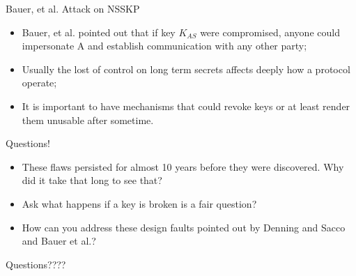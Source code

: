 \documentclass[12pt,table,xcolor={dvipsnames}]{beamer}
\begin{document}
\begin{frame}{Bauer, et al. Attack on NSSKP}
\begin{itemize}
\item Bauer, et al. pointed out that if key $K_{AS}$ were compromised, anyone could impersonate A and establish communication with any other party;\pause
\item Usually the lost of control on long term secrets affects deeply how a protocol operate;\pause
\item It is important to have mechanisms that could revoke keys or at least render them unusable after sometime.
\end{itemize}
\end{frame}

\begin{frame}{Questions!}
\begin{itemize}
\item These flaws persisted for almost 10 years before they were discovered. Why did it take that long to see that?\pause
\item Ask what happens if a key is broken is a fair question?\pause
\item How can you address these design faults pointed out by Denning and Sacco and Bauer et al.?
\end{itemize}
\end{frame}


{
\begin{frame}

{\LARGE Questions????}

\end{frame}
}
\end{document}
